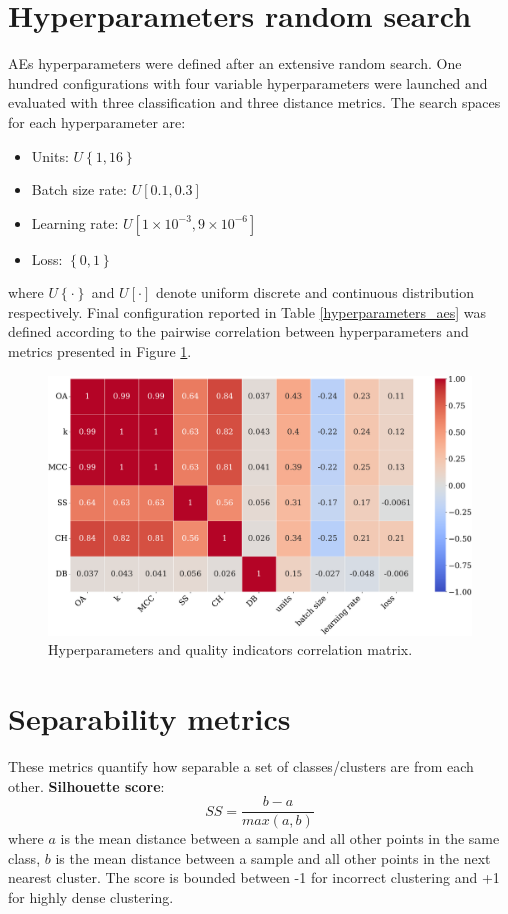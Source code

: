\documentclass[journal,article,submit,pdftex,moreauthors]{Definitions/mdpi}
\begin{document}
\appendixstart
\appendix
\section[\appendixname~\thesection]{Hyperparameters random search}\label{app_a}
AEs hyperparameters were defined after an extensive random search. One hundred configurations with four variable hyperparameters were launched and evaluated with three classification and three distance metrics.
The search spaces for each hyperparameter are:
\begin{itemize}
	\item Units: $U\left\{1,16\right\}$
	\item Batch size rate: $U\left[0.1,0.3\right]$ 
	\item Learning rate: $U\left[1\times10^{-3},9\times10^{-6}\right]$
	\item Loss: $\left\{0,1\right\}$
\end{itemize}
where $U\left\{\cdot\right\}$ and $U\left[\cdot\right]$ denote uniform discrete and continuous distribution respectively.
Final configuration reported in Table \ref{hyperparameters_aes} was defined according to the pairwise correlation between hyperparameters and metrics presented in Figure \ref{correlation_matrix}.
\begin{figure}[H]
	\centering
	\includegraphics[width=.67\textwidth]{figures/hyperparameter_results_update_latex.pdf}
	\caption{Hyperparameters and quality indicators correlation matrix.}
	\label{correlation_matrix}
\end{figure}
\section[\appendixname~\thesection]{Separability metrics}\label{app_distance_m} 
These metrics quantify how separable a set of classes/clusters are from each other.
\textbf{Silhouette score}:
    \begin{equation}
        SS = \frac{b-a}{max(a,b)}
    \end{equation}
where $a$ is the mean distance between a sample and all other points in the same class, $b$ is the mean distance between a sample and all other points in the next nearest cluster. The score is bounded between -1 for incorrect clustering and +1 for highly dense clustering.\\
\end{document}
